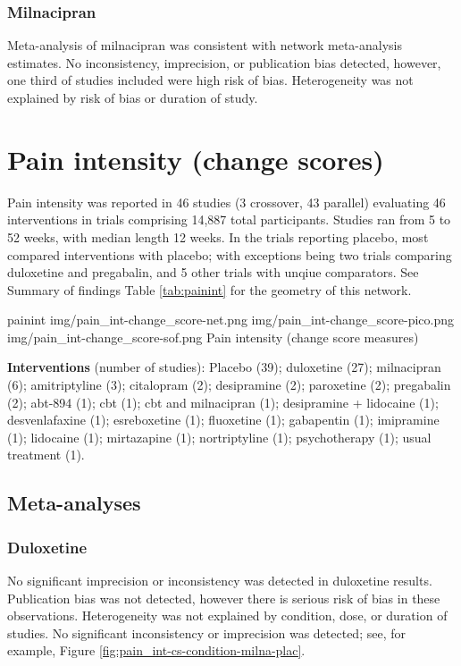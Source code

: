 \documentclass{report}\usepackage[]{graphicx}\usepackage[]{color}
\begin{document}
\subsubsection{Milnacipran}

Meta-analysis of milnacipran was consistent with network meta-analysis estimates. No inconsistency, imprecision, or publication bias detected, however, one third of studies included were high risk of bias. Heterogeneity was not explained by risk of bias or duration of study.


\section{Pain intensity (change scores)}


Pain intensity was reported in 46 studies (3 crossover, 43 parallel) evaluating 46 interventions in trials comprising 14,887 total participants. Studies ran from 5 to 52 weeks, with median length 12 weeks. In the trials reporting placebo, most compared interventions with placebo; with exceptions being two trials comparing duloxetine and pregabalin, and 5 other trials with unqiue comparators. See Summary of findings Table \ref{tab:painint} for the geometry of this network.

\soffignew
{painint}
{img/pain_int-change_score-net.png}
{img/pain_int-change_score-pico.png}
{img/pain_int-change_score-sof.png}
{Pain intensity (change score measures)}

\textbf{Interventions} (number of studies): Placebo (39); duloxetine (27); milnacipran (6); amitriptyline (3); citalopram (2); desipramine (2); paroxetine (2); pregabalin (2); abt-894 (1); cbt (1); cbt and milnacipran (1); desipramine + lidocaine (1); desvenlafaxine (1); esreboxetine (1); fluoxetine (1); gabapentin (1); imipramine (1); lidocaine (1); mirtazapine (1); nortriptyline (1); psychotherapy (1); usual treatment (1).

\subsection{Meta-analyses}


\subsubsection{Duloxetine}

No significant imprecision or inconsistency was detected in duloxetine results. Publication bias was not detected, however there is serious risk of bias in these observations. Heterogeneity was not explained by condition, dose, or duration of studies. No significant inconsistency or imprecision was detected; see, for example, Figure \ref{fig:pain_int-cs-condition-milna-plac}.
\end{document}
